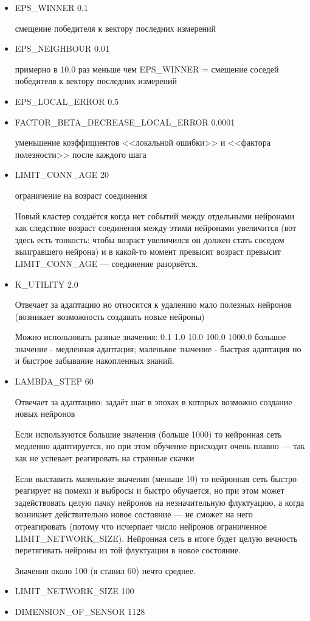 \documentclass[unicode, 12pt, a4paper,oneside,fleqn]{article}
\begin{document}
\begin{itemize}
\item EPS\_WINNER 0.1

  смещение победителя к вектору последних измерений

\item EPS\_NEIGHBOUR 0.01

  примерно в 10.0 раз меньше чем EPS\_WINNER = смещение соседей
  победителя к вектору последних измерений

\item EPS\_LOCAL\_ERROR 0.5

\item FACTOR\_BETA\_DECREASE\_LOCAL\_ERROR 0.0001

  уменьшение коэффициентов <<локальной ошибки>> и <<фактора
  полезности>> после каждого шага

\item LIMIT\_CONN\_AGE 20

  ограничение на возраст соединения

  Новый кластер создаётся когда нет событий между отдельными нейронами
  как следствие возраст соединения между этими нейронами увеличится
  (вот здесь есть тонкость: чтобы возраст увеличился он должен стать
  соседом выигравшего нейрона) и в какой-то момент превысит возраст
  превысит LIMIT\_CONN\_AGE --- соединение разорвётся.
\item K\_UTILITY 2.0

  Отвечает за адаптацию но относится к удалению мало полезных нейронов
  (возникает возможность создавать новые нейроны)

  Можно использовать разные значения: 0.1 1.0 10.0 100.0 1000.0
  большое значение - медленная адаптация; маленькое значение - быстрая
  адаптация но и быстрое забывание накопленных знаний.

\item LAMBDA\_STEP 60

  Отвечает за адаптацию: задаёт шаг в эпохах в которых
  возможно создание новых нейронов

  Если используются большие значения (больше 1000) то нейронная сеть
  медленно адаптируется, но при этом обучение присходит очень плавно
  --- так как не успевает реагировать на странные скачки

  Если выставить маленькие значения (меньше 10) то нейронная сеть
  быстро реагирует на помехи и выбросы и быстро обучается, но при этом
  может задействовать целую пачку нейронов на незначительную
  флуктуацию, а когда возникнет действительно новое состояние --- не
  сможет на него отреагировать (потому что исчерпает число нейронов
  ограниченное LIMIT\_NETWORK\_SIZE).  Нейронная сеть в итоге будет
  целую вечность перетягивать нейроны из той флуктуации в новое
  состояние.

  Значения около 100 (я ставил 60) нечто среднее.

\item LIMIT\_NETWORK\_SIZE 100

\item DIMENSION\_OF\_SENSOR 1128

\end{itemize}
\end{document}
